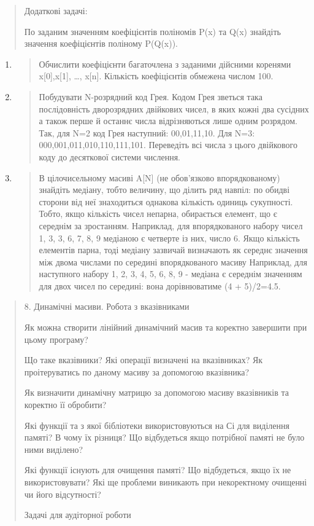 \documentclass[]{article}
\begin{document}
\begin{quote}
Додаткові задачі:

По заданим значенням коефіцієнтів поліномів P(x) та Q(x) знайдіть
значення коефіцієнтів поліному P(Q(x)).
\end{quote}

\begin{enumerate}
\def\labelenumi{\arabic{enumi})}
\setcounter{enumi}{12}
\item
  \begin{quote}
  Обчислити коефіцієнти багаточлена з заданими дійсними коренями
  x{[}0{]},x{[}1{]}, \ldots{}, x{[}n{]}. Кількість коефіцієнтів обмежена
  числом 100.
  \end{quote}
\item
  \begin{quote}
  Побудувати N-розрядний код Грея. Кодом Грея зветься така послідовність
  дворозрядних двійкових чисел, в яких кожні два сусідних а також перше
  й останнє числа відрізняються лише одним розрядом. Так, для N=2 код
  Грея наступний: 00,01,11,10. Для N=3: 000,001,011,010,110,111,101.
  Переведіть всі числа з цього двійкового коду до десяткової системи
  числення.
  \end{quote}
\item
  \begin{quote}
  В цілочисельному масиві A{[}N{]} (не обов'язково впорядкованому)
  знайдіть медіану, тобто величину, що ділить ряд навпіл: по обидві
  сторони від неї знаходиться однакова кількість одиниць сукупності.
  Тобто, якщо кількість чисел непарна, обирається елемент, що є середнім
  за зростанням. Наприклад, для впорядкованого набору чисел 1, 3, 3, 6,
  7, 8, 9 медіаною є четверте із них, число 6. Якщо кількість елементів
  парна, тоді медіану зазвичай визначають як середнє значення між двома
  числами по середині впорядкованого масиву Наприклад, для наступного
  набору 1, 2, 3, 4, 5, 6, 8, 9 - медіана є середнім значенням для двох
  чисел по середині: вона дорівнюватиме (4 + 5)/2=4.5.
  \end{quote}
\end{enumerate}

\begin{quote}
8. Динамічні масиви. Робота з вказівниками

Як можна створити лінійний динамічний масив та коректно завершити при
цьому програму?

Що таке вказівники? Які операції визначені на вказівниках? Як
проітеруватись по даному масиву за допомогою вказівника?

Як визначити динамічну матрицю за допомогою масиву вказівників та
коректно її обробити?

Які функції та з якої бібліотеки використовуються на Сі для виділення
памяті? В чому їх різниця? Що відбудеться якщо потрібної памяті не було
ними виділено?

Які функції існують для очищення памяті? Що відбудеться, якщо їх не
використовувати? Які ще проблеми виникають при некоректному очищенні чи
його відсутності?

Задачі для аудіторної роботи
\end{quote}
\end{document}

